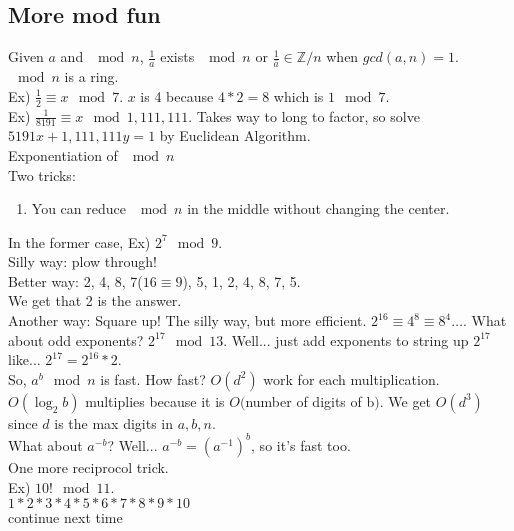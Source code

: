 \documentclass[13pt]{article}
\begin{document}
	\subsection*{More mod fun}
	Given $a$ and $\mod n$, $\frac{1}{a}$ exists $\mod n$ or $\frac{1}{\bar{a}}
	\in \mathbb{Z}/n$ when $gcd(a,n) = 1$.\\
	$\mod n$ is a ring.\\
	Ex) $\frac{1}{2} \equiv x \mod 7$. $x$ is 4 because $4*2 = 8$ which is
	$1 \mod 7$. \\
	Ex) $\frac{1}{8191} \equiv x \mod 1,111,111$. Takes way to long to factor,
	so solve $5191x + 1,111,111y = 1$ by Euclidean Algorithm.\\
	Exponentiation of $\mod n$\\
	Two tricks:
	\begin{enumerate}
		\item You can reduce $\mod n$ in the middle without changing the center.
	\end{enumerate}
	In the former case,
	Ex) $2^7 \mod 9$.\\
	Silly way: plow through!\\
	Better way: 2, 4, 8, 7($16 \equiv 9$), 5, 1, 2, 4, 8, 7, 5.\\
	We get that 2 is the answer.\\
	Another way: Square up! The silly way, but more efficient. $2^16 \equiv
	4^8 \equiv 8^4 \ldots$. What about odd exponents? $2^17 \mod 13$. Well...
	just add exponents to string up $2^17$ like... $2^17 = 2^16 * 2$.\\
	So, $a^b \mod n$ is fast. How fast? $O(d^2)$ work for each multiplication.
	$O(\log_2{b})$ multiplies because it is $O($number of digits of b$)$.
	We get $O(d^3)$ since $d$ is the max digits in $a,b,n$.\\
	What about $a^{-b}$? Well... $a^{-b} = (a^{-1})^b$, so it's fast too.\\
	One more reciprocol trick.\\
	Ex) $10! \mod 11$. \\
		$1 * 2 * 3 * 4 * 5 * 6 * 7 * 8 * 9 * 10$\\
		continue next time\\
\end{document}
